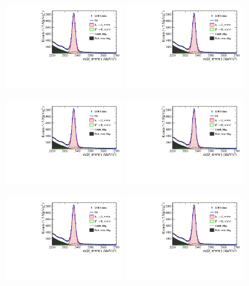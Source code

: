 \begin{figure}[h]
\centering
\includegraphics[height=!,width=0.4\textwidth]{figs/MassFit/norm_y15_phipi.pdf}
\includegraphics[height=!,width=0.4\textwidth]{figs/MassFit/norm_y15_KsK.pdf}

\includegraphics[height=!,width=0.4\textwidth]{figs/MassFit/norm_y15_KKpi_NR.pdf}
\includegraphics[height=!,width=0.4\textwidth]{figs/MassFit/norm_y15_pipipi.pdf}

\includegraphics[height=!,width=0.4\textwidth]{figs/MassFit/norm_y16_phipi.pdf}
\includegraphics[height=!,width=0.4\textwidth]{figs/MassFit/norm_y16_KsK.pdf}


\end{figure}
